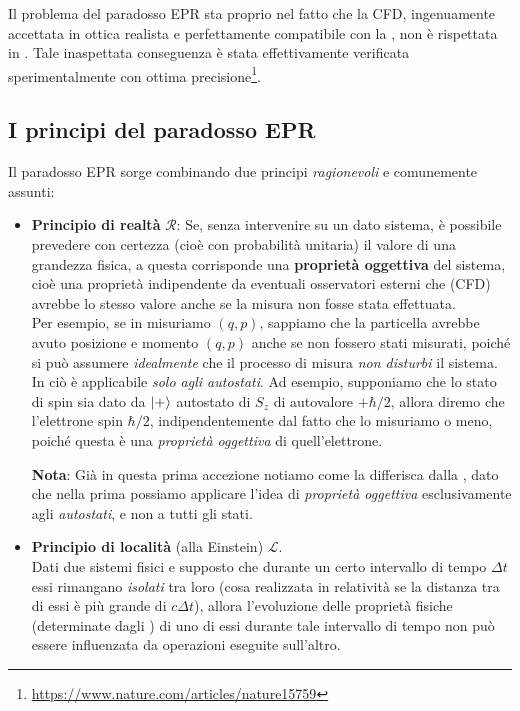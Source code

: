 \documentclass[../../FisicaTeorica.tex]{subfiles}
\begin{document}
Il problema del paradosso EPR sta proprio nel fatto che la CFD, ingenuamente accettata in ottica realista e perfettamente compatibile con la \MC, non è rispettata in \MQ. Tale inaspettata conseguenza è stata effettivamente verificata sperimentalmente con ottima precisione\footnote{\url{https://www.nature.com/articles/nature15759}}.


\subsection{I principi del paradosso EPR}
Il paradosso EPR sorge combinando due principi \textit{ragionevoli} e comunemente assunti:
\begin{itemize}
\item \textbf{Principio di realtà} $\mathcal{R}$: Se, senza intervenire su un dato sistema, è possibile prevedere con certezza (cioè con probabilità unitaria) il valore di una grandezza fisica, a questa corrisponde una \textbf{proprietà oggettiva} del sistema, cioè una proprietà indipendente da eventuali osservatori esterni che (CFD) avrebbe lo stesso valore anche se la misura non fosse stata effettuata.\\

Per esempio, se in \MC misuriamo $(q,p)$, sappiamo che la particella avrebbe avuto posizione e momento $(q,p)$ anche se non fossero stati misurati, poiché si può assumere \textit{idealmente} che il processo di misura \textit{non disturbi} il sistema.\\
In \MQ ciò è applicabile \textit{solo agli autostati}. Ad esempio, supponiamo che lo stato di spin sia dato da $\Ket{+}$ autostato di $S_z$ di autovalore $+\hbar/2$, allora diremo che l'elettrone  spin $\hbar/2$, indipendentemente dal fatto che lo misuriamo o meno, poiché questa è una \textit{proprietà oggettiva} di quell'elettrone.

\textbf{Nota}: Già in questa prima accezione notiamo come la \MQ differisca dalla \MC, dato che nella prima possiamo  applicare l'idea di \textit{proprietà oggettiva} esclusivamente agli \textit{autostati}, e non a tutti gli stati.
\item \textbf{Principio di località} (alla Einstein) $\mathcal{L}$.\\
Dati due sistemi fisici e supposto che durante un certo intervallo di tempo $\Delta t$ essi rimangano \textit{isolati} tra loro (cosa realizzata in relatività se la distanza tra di essi è più grande di $c\Delta t$), allora l'evoluzione delle proprietà fisiche (determinate dagli ) di uno di essi durante tale intervallo di tempo non può essere influenzata da operazioni eseguite sull'altro.


\end{itemize}
\end{document}
